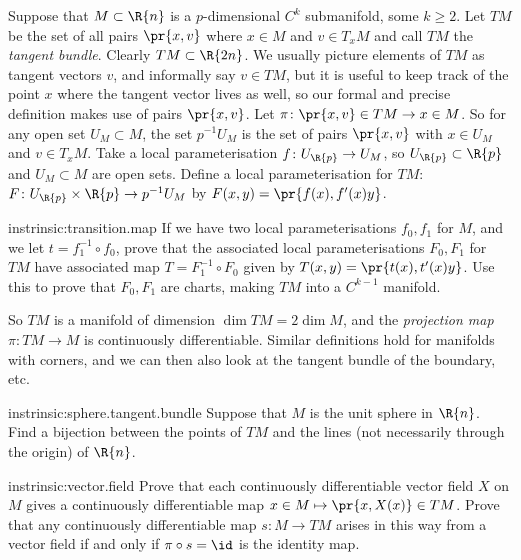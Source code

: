 \label{section:instrinsic:tangent.bundle}%
Suppose that \(M \subset \R{n}\) is a \(p\)-dimensional \(C^k\) submanifold, some \(k \ge 2\).
Let \(TM\)%
be the set of all pairs \(\pr{x,v}\) where \(x \in M\) and \(v \in T_x M\) and call \(TM\) the \emph{tangent bundle}.%
Clearly \(TM \subset \R{2n}\).
We usually picture elements of \(TM\) as tangent vectors \(v\), and informally say \(v \in TM\), but it is useful to keep track of the point \(x\) where the tangent vector lives as well, so our formal and precise definition makes use of pairs \(\pr{x,v}\).
Let \(\pi \colon \pr{x,v} \in TM \to x \in M\).
So for any open set \(U_M \subset M\), the set \(p^{-1}U_M\) is the set of pairs \(\pr{x,v}\) with \(x \in U_M\) and \(v \in T_x M\).
Take a local parameterisation \(f \colon U_{\R{p}} \to U_M\), so \(U_{\R{p}} \subset \R{p}\) and \(U_M \subset M\) are open sets.
Define a local parameterisation for \(TM\): \(F \colon U_{\R{p}} \times \R{p} \to p^{-1}U_M\) by \(F(x,y)=\pr{f(x),f'(x)y}\).
\begin{problem}{instrinsic:transition.map}
If we have two local parameterisations \(f_0, f_1\) for \(M\), and we let \(t=f_1^{-1} \circ f_0\), prove that the associated local parameterisations \(F_0, F_1\) for \(TM\) have associated map \(T=F_1^{-1} \circ F_0\) given by \(T(x,y)=\pr{t(x),t'(x)y}\).
Use this to prove that \(F_0, F_1\) are charts, making \(TM\) into a \(C^{k-1}\) manifold.
\end{problem}
So \(TM\) is a manifold of dimension \(\dim TM = 2 \dim M\), and the \emph{projection map}%
\(\pi \colon TM \to M\) is continuously differentiable.
Similar definitions hold for manifolds with corners, and we can then also look at the tangent bundle of the boundary, etc.
\begin{problem}{instrinsic:sphere.tangent.bundle}
Suppose that \(M\) is the unit sphere in \(\R{n}\).
Find a bijection between the points of \(TM\) and the lines (not necessarily through the origin) of \(\R{n}\).
\end{problem}
\begin{problem}{instrinsic:vector.field}
Prove that each continuously differentiable vector field \(X\) on \(M\) gives a continuously differentiable map \(x \in M \mapsto \pr{x,X(x)} \in TM\).
Prove that any continuously differentiable map \(s \colon M \to TM\) arises in this way from a vector field if and only if \(\pi \circ s=\id\) is the identity map.
\end{problem}


